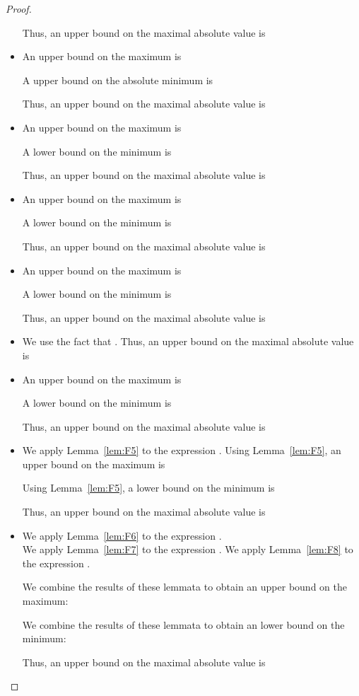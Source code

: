 \documentclass{article}
\begin{document}
\begin{proof}
\begin{itemize}
Thus, an upper bound on the maximal absolute value is 


\item 

An upper bound on the maximum is

A upper bound on the absolute minimum is

Thus, an upper bound on the maximal absolute value is 


\item 

An upper bound on the maximum is

A lower bound on the minimum is

Thus, an upper bound on the maximal absolute value is 


\item 

An upper bound on the maximum is

A lower bound on the minimum is

Thus, an upper bound on the maximal absolute value is 


\item 

An upper bound on the maximum is

A lower bound on the minimum is

Thus, an upper bound on the maximal absolute value is 


\item 


We use the fact that .
Thus, an upper bound on the maximal absolute value is 


\item 

An upper bound on the maximum is

A lower bound on the minimum is

Thus, an upper bound on the maximal absolute value is 


\item 

We apply Lemma~\ref{lem:F5} to the expression
.
Using  Lemma~\ref{lem:F5}, an upper bound on the maximum is

Using  Lemma~\ref{lem:F5}, a lower bound on the minimum is

Thus, an upper bound on the maximal absolute value is 


\item 

We apply Lemma~\ref{lem:F6} to the expression
. \\
We apply Lemma~\ref{lem:F7} to the expression 
. 
We apply Lemma~\ref{lem:F8} to the expression
. 

We combine the results of these lemmata to obtain 
an upper bound on the maximum:

We combine the results of these lemmata to obtain 
an lower bound on the minimum:

Thus, an upper bound on the maximal absolute value is 

\end{itemize}
\end{proof}
\end{document}
